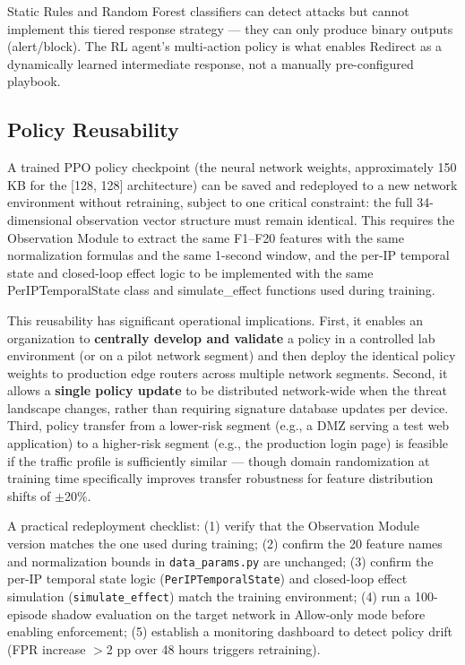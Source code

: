 \documentclass[12pt,a4paper]{report}
\begin{document}
Static Rules and Random Forest classifiers can detect attacks but cannot implement this tiered response strategy --- they can only produce binary outputs (alert/block). The RL agent's multi-action policy is what enables Redirect as a dynamically learned intermediate response, not a manually pre-configured playbook.

\subsection{Policy Reusability}

A trained PPO policy checkpoint (the neural network weights, approximately 150 KB for the [128, 128] architecture) can be saved and redeployed to a new network environment without retraining, subject to one critical constraint: the full 34-dimensional observation vector structure must remain identical. This requires the Observation Module to extract the same F1--F20 features with the same normalization formulas and the same 1-second window, and the per-IP temporal state and closed-loop effect logic to be implemented with the same PerIPTemporalState class and simulate\_effect functions used during training.

This reusability has significant operational implications. First, it enables an organization to \textbf{centrally develop and validate} a policy in a controlled lab environment (or on a pilot network segment) and then deploy the identical policy weights to production edge routers across multiple network segments. Second, it allows a \textbf{single policy update} to be distributed network-wide when the threat landscape changes, rather than requiring signature database updates per device. Third, policy transfer from a lower-risk segment (e.g., a DMZ serving a test web application) to a higher-risk segment (e.g., the production login page) is feasible if the traffic profile is sufficiently similar --- though domain randomization at training time specifically improves transfer robustness for feature distribution shifts of $\pm$20\%.

A practical redeployment checklist: (1) verify that the Observation Module version matches the one used during training; (2) confirm the 20 feature names and normalization bounds in \texttt{data\_params.py} are unchanged; (3) confirm the per-IP temporal state logic (\texttt{PerIPTemporalState}) and closed-loop effect simulation (\texttt{simulate\_effect}) match the training environment; (4) run a 100-episode shadow evaluation on the target network in Allow-only mode before enabling enforcement; (5) establish a monitoring dashboard to detect policy drift (FPR increase $>$2 pp over 48 hours triggers retraining).
\end{document}
